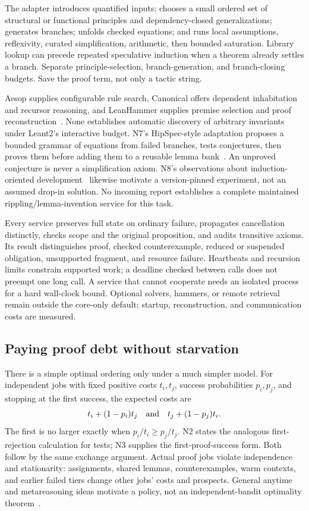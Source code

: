 The adapter introduces quantified inputs; chooses a small ordered set of structural or functional principles and dependency-closed generalizations; generates branches; unfolds checked equations; and runs local assumptions, reflexivity, curated simplification, arithmetic, then bounded saturation. Library lookup can precede repeated speculative induction when a theorem already settles a branch. Separate principle-selection, branch-generation, and branch-closing budgets. Save the proof term, not only a tactic string.

Aesop supplies configurable rule search, Canonical offers dependent inhabitation and recursor reasoning, and LeanHammer supplies premise selection and proof reconstruction~\cite{aesop,canonical,leanhammer}. None establishes automatic discovery of arbitrary invariants under Leant2's interactive budget. N7's HipSpec-style adaptation proposes a bounded grammar of equations from failed branches, tests conjectures, then proves them before adding them to a reusable lemma bank~\cite{hipspec}. An unproved conjecture is never a simplification axiom. N8's observations about induction-oriented  development~\cite{lean426} likewise motivate a version-pinned experiment, not an assumed drop-in solution. No incoming report establishes a complete maintained rippling/lemma-invention service for this task.

Every service preserves full state on ordinary failure, propagates cancellation distinctly, checks scope and the original proposition, and audits transitive axioms. Its result distinguishes proof, checked counterexample, reduced or suspended obligation, unsupported fragment, and resource failure. Heartbeats and recursion limits constrain supported work; a deadline checked between calls does not preempt one long call. A service that cannot cooperate needs an isolated process for a hard wall-clock bound. Optional solvers, hammers, or remote retrieval remain outside the core-only default; startup, reconstruction, and communication costs are measured.

\subsection{Paying proof debt without starvation}\label{sec:contract-proof-debt}

There is a simple optimal ordering only under a much simpler model. For independent jobs with fixed positive costs $t_i,t_j$, success probabilities $p_i,p_j$, and stopping at the first success, the expected costs are
\[
 t_i+(1-p_i)t_j\quad\hbox{and}\quad t_j+(1-p_j)t_i.
\]
The first is no larger exactly when $p_i/t_i\ge p_j/t_j$. N2 states the analogous first-rejection calculation for tests; N3 supplies the first-proof-success form. Both follow by the same exchange argument. Actual proof jobs violate independence and stationarity: assignments, shared lemmas, counterexamples, warm contexts, and earlier failed tiers change other jobs' costs and prospects. General anytime and metareasoning ideas motivate a policy, not an independent-bandit optimality theorem~\cite{anytime,metareasoning}.

